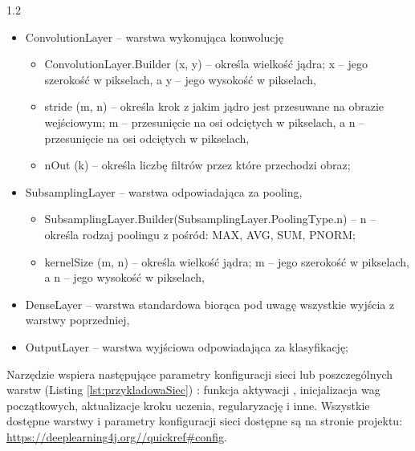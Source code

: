 \documentclass[a4paper,12pt]{article}
\newcommand\spacingInSolemnItemize{1.2}
\newcommand\spacingVspace{0.7em}
\begin{document}
			\begin{spacing}{\spacingInSolemnItemize}
				\begin{itemize}
					\item ConvolutionLayer -- warstwa wykonująca konwolucję
						\begin{itemize}
							\item ConvolutionLayer.Builder (x, y) -- określa wielkość jądra; x -- jego szerokość w pikselach, a y -- jego wysokość w pikselach,
							\item stride (m, n) -- określa krok z jakim jądro jest przesuwane na obrazie wejściowym; m -- przesunięcie na osi odciętych w pikselach, 
								a n -- przesunięcie na osi odciętych w pikselach,
							\item nOut (k) -- określa liczbę filtrów przez które przechodzi obraz;
						\end{itemize}
					\item SubsamplingLayer -- warstwa odpowiadająca za pooling,
						\begin{itemize}
							\item SubsamplingLayer.Builder(SubsamplingLayer.PoolingType.n) -- n -- określa rodzaj poolingu z pośród: MAX, AVG, SUM, PNORM; 
							\item kernelSize (m, n) -- określa wielkość jądra; m -- jego szerokość w pikselach, a n -- jego wysokość w pikselach,
						\end{itemize}
					\item DenseLayer -- warstwa standardowa biorąca pod uwagę wszystkie wyjścia z warstwy poprzedniej,
					\item OutputLayer -- warstwa wyjściowa odpowiadająca za klasyfikację;
				\end{itemize}
			\end{spacing}
			\vspace{\spacingVspace}
		 Narzędzie wspiera następujące parametry konfiguracji sieci lub poszczególnych warstw (Listing \ref{lst:przykladowaSiec}) : funkcja aktywacji , inicjalizacja wag początkowych, 
			aktualizacje kroku uczenia, regularyzację i inne. Wszystkie dostępne warstwy i parametry konfiguracji sieci dostępne są na stronie projektu:
			\href{https://deeplearning4j.org//quickref\#config}{\url{https://deeplearning4j.org//quickref\#config}}.
			\newline
		
            
		
\end{document}
